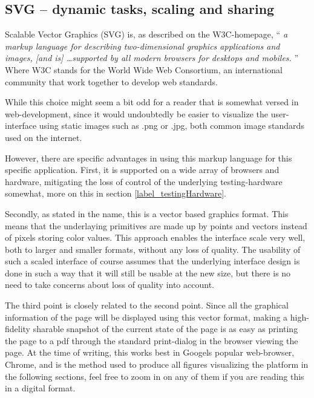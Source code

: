 {  \subsection{SVG -- dynamic tasks, scaling and
  sharing}\label{label_svg_section}

  Scalable Vector Graphics (SVG) is, as described on the W3C-homepage, ``%
  \textit{%
    a markup language for describing two-dimensional graphics applications and
    images, [and is] \ldots supported by all modern browsers for desktops and
    mobiles.%
  }''\cite{citeW3CSVG}
  Where W3C stands for the World Wide Web Consortium, an international
  community that work together to develop web standards\cite{citeW3CHomepage}.

  While this choice might seem a bit odd for a reader that is somewhat versed
  in web-development, since it would undoubtedly be easier to visualize the
  user-interface using static images such as .png or .jpg, both common image
  standards used on the internet.

  However, there are specific advantages in using this markup language for this
  specific application. First, it is supported on a wide array of browsers and
  hardware, mitigating the loss of control of the underlying testing-hardware
  somewhat, more on this in section \ref{label_testingHardware}.

  Secondly, as stated in the name, this is a vector based graphics format.
  This means that the underlaying primitives are made up by  points and vectors
  instead of pixels storing color values. This approach enables the interface
  scale very well, both to larger and smaller formats, without any loss of
  quality. The usability of such a scaled interface of course assumes that the
  underlying interface design is done in such a way that it will still be
  usable at the new size, but there is no need to take concerns about loss of
  quality into account.

  The third point is closely related to the second point. Since all the
  graphical information of the page will be displayed using this vector format,
  making a high-fidelity sharable snapshot of the current state of the page is
  as easy as printing the page to a pdf through the standard print-dialog in
  the browser viewing the page. At the time of writing, this works best
  in Googels popular web-browser, Chrome, and is the method used to produce all
  figures visualizing the platform in the following sections, feel free to zoom
  in on any of them if you are reading this in a digital format.

}
